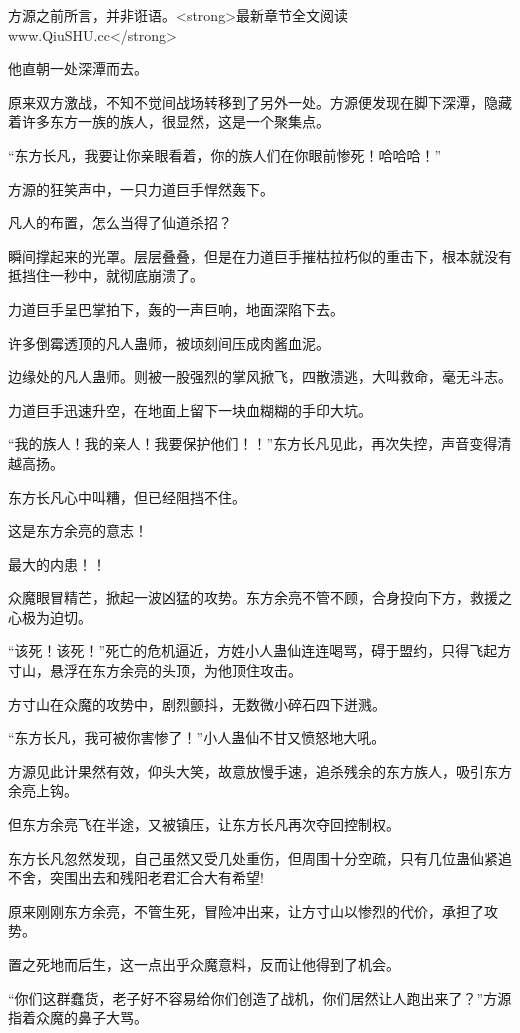 \begin{this_body}
方源之前所言，并非诳语。<strong>最新章节全文阅读www.QiuSHU.cc</strong>

他直朝一处深潭而去。

原来双方激战，不知不觉间战场转移到了另外一处。方源便发现在脚下深潭，隐藏着许多东方一族的族人，很显然，这是一个聚集点。

“东方长凡，我要让你亲眼看着，你的族人们在你眼前惨死！哈哈哈！”

方源的狂笑声中，一只力道巨手悍然轰下。

凡人的布置，怎么当得了仙道杀招？

瞬间撑起来的光罩。层层叠叠，但是在力道巨手摧枯拉朽似的重击下，根本就没有抵挡住一秒中，就彻底崩溃了。

力道巨手呈巴掌拍下，轰的一声巨响，地面深陷下去。

许多倒霉透顶的凡人蛊师，被顷刻间压成肉酱血泥。

边缘处的凡人蛊师。则被一股强烈的掌风掀飞，四散溃逃，大叫救命，毫无斗志。

力道巨手迅速升空，在地面上留下一块血糊糊的手印大坑。

“我的族人！我的亲人！我要保护他们！！”东方长凡见此，再次失控，声音变得清越高扬。

东方长凡心中叫糟，但已经阻挡不住。

这是东方余亮的意志！

最大的内患！！

众魔眼冒精芒，掀起一波凶猛的攻势。东方余亮不管不顾，合身投向下方，救援之心极为迫切。

“该死！该死！”死亡的危机逼近，方姓小人蛊仙连连喝骂，碍于盟约，只得飞起方寸山，悬浮在东方余亮的头顶，为他顶住攻击。

方寸山在众魔的攻势中，剧烈颤抖，无数微小碎石四下迸溅。

“东方长凡，我可被你害惨了！”小人蛊仙不甘又愤怒地大吼。

方源见此计果然有效，仰头大笑，故意放慢手速，追杀残余的东方族人，吸引东方余亮上钩。

但东方余亮飞在半途，又被镇压，让东方长凡再次夺回控制权。

东方长凡忽然发现，自己虽然又受几处重伤，但周围十分空疏，只有几位蛊仙紧追不舍，突围出去和残阳老君汇合大有希望!

原来刚刚东方余亮，不管生死，冒险冲出来，让方寸山以惨烈的代价，承担了攻势。

置之死地而后生，这一点出乎众魔意料，反而让他得到了机会。

“你们这群蠢货，老子好不容易给你们创造了战机，你们居然让人跑出来了？”方源指着众魔的鼻子大骂。


\end{this_body}
